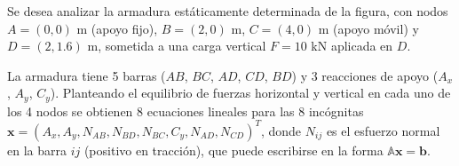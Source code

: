 \documentclass[11pt]{article}
\begin{document}
\begin{question} %
	Se desea analizar la armadura estáticamente determinada de la figura, con nodos
	$A=(0,0)$ m (apoyo fijo), $B=(2,0)$ m, $C=(4,0)$ m (apoyo móvil) y $D=(2, 1.6)$ m,
	sometida a una carga vertical $F = 10$ kN aplicada en $D$.

	\begin{center}
	\end{center}

	La armadura tiene 5 barras ($AB$, $BC$, $AD$, $CD$, $BD$) y 3 reacciones de apoyo
	($A_x$, $A_y$, $C_y$). Planteando el equilibrio de fuerzas horizontal y vertical en
	cada uno de los 4 nodos se obtienen 8 ecuaciones lineales para las 8 incógnitas
	$\bm{x} = (A_x, A_y, N_{AB}, N_{BD}, N_{BC}, C_y, N_{AD}, N_{CD})^T$, donde $N_{ij}$
	es el esfuerzo normal en la barra $ij$ (positivo en tracción), que puede escribirse
	en la forma $\mathbb{A} \bm{x} = \bm{b}$.


\end{question}
\end{document}
